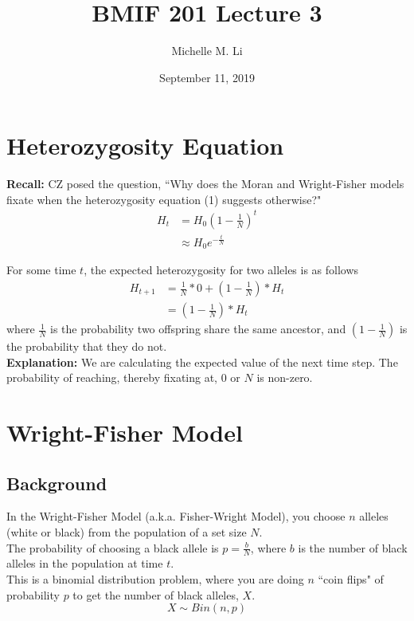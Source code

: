 \documentclass[12pt]{extarticle}
\title{BMIF 201 Lecture 3}
\author{Michelle M. Li}
\date{September 11, 2019}
\newcommand{\<}{\langle}
\renewcommand{\>}{\rangle}
\theoremstyle{definition}
\begin{document}
\maketitle

\section{Heterozygosity Equation}

\textbf{Recall:} CZ posed the question, ``Why does the Moran and Wright-Fisher models fixate when the heterozygosity equation (1) suggests otherwise?"
\begin{align}
    H_t &= H_0(1 - \frac{1}{N})^t \nonumber \\
    &\approx H_0e^{-\frac{t}{N}} \label{H_0}
\end{align}

\noindent For some time $t$, the expected heterozygosity for two alleles is as follows
\begin{align}
    H_{t + 1} &= \frac{1}{N}*0 + (1 - \frac{1}{N})*H_t \nonumber \\
    &= (1 - \frac{1}{N})*H_t \label{H_t}
\end{align}
where $\frac{1}{N}$ is the probability two offspring share the same ancestor, and $(1 - \frac{1}{N})$ is the probability that they do not.\\

\noindent \textbf{Explanation:} We are calculating the expected value of the next time step. The probability of reaching, thereby fixating at, $0$ or $N$ is non-zero.

\section{Wright-Fisher Model}

\subsection{Background}

In the Wright-Fisher Model (a.k.a. Fisher-Wright Model), you choose $n$ alleles (white or black) from the population of a set size $N$.\\

\noindent The probability of choosing a black allele is $p = \frac{b}{N}$, where $b$ is the number of black alleles in the population at time $t$.\\

\noindent This is a binomial distribution problem, where you are doing $n$ ``coin flips" of probability $p$ to get the number of black alleles, $X$.
\begin{equation}
    X \sim Bin(n, p) \label{bin}
\end{equation}
\end{document}
